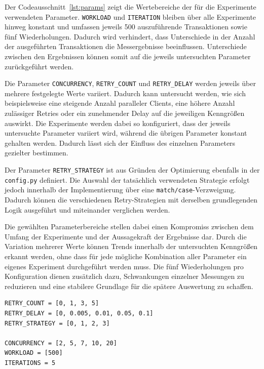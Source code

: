 
Der Codeausschnitt~\ref{lst:params} zeigt die Wertebereiche der für die Experimente verwendeten Parameter.
\texttt{WORKLOAD} und \texttt{ITERATION} bleiben über alle Experimente hinweg konstant und umfassen jeweils
500 auszuführende Transaktionen sowie fünf Wiederholungen.
Dadurch wird verhindert, dass Unterschiede in der Anzahl der ausgeführten Transaktionen die Messergebnisse
beeinflussen.
Unterschiede zwischen den Ergebnissen können somit auf die jeweils untersuchten Parameter zurückgeführt werden.

Die Parameter \texttt{CONCURRENCY}, \texttt{RETRY\_COUNT} und \texttt{RETRY\_DELAY} werden jeweils über mehrere
festgelegte Werte variiert.
Dadurch kann untersucht werden, wie sich beispielsweise eine steigende Anzahl paralleler Clients, eine höhere
Anzahl zulässiger Retries oder ein zunehmender Delay auf die jeweiligen Kenngrößen auswirkt.
Die Experimente werden dabei so konfiguriert, dass der jeweils untersuchte Parameter variiert wird, während die
übrigen Parameter konstant gehalten werden.
Dadurch lässt sich der Einfluss des einzelnen Parameters gezielter bestimmen.

Der Parameter \texttt{RETRY\_STRATEGY} ist aus Gründen der Optimierung ebenfalls in der \texttt{config.py} definiert.
Die Auswahl der tatsächlich verwendeten Strategie erfolgt jedoch innerhalb der Implementierung über eine
\texttt{match/case}-Verzweigung.
Dadurch können die verschiedenen Retry-Strategien mit derselben grundlegenden Logik ausgeführt und miteinander
verglichen werden.

Die gewählten Parameterbereiche stellen dabei einen Kompromiss zwischen dem Umfang der Experimente und der
Aussagekraft der Ergebnisse dar.
Durch die Variation mehrerer Werte können Trends innerhalb der untersuchten Kenngrößen erkannt werden, ohne dass
für jede mögliche Kombination aller Parameter ein eigenes Experiment durchgeführt werden muss.
Die fünf Wiederholungen pro Konfiguration dienen zusätzlich dazu, Schwankungen einzelner Messungen zu reduzieren
und eine stabilere Grundlage für die spätere Auswertung zu schaffen.

\begin{lstlisting}[style=pythoncode, caption={Übersicht der Parameter}, label={lst:params}]
RETRY_COUNT = [0, 1, 3, 5]
RETRY_DELAY = [0, 0.005, 0.01, 0.05, 0.1]
RETRY_STRATEGY = [0, 1, 2, 3]

CONCURRENCY = [2, 5, 7, 10, 20]
WORKLOAD = [500]
ITERATIONS = 5
\end{lstlisting}